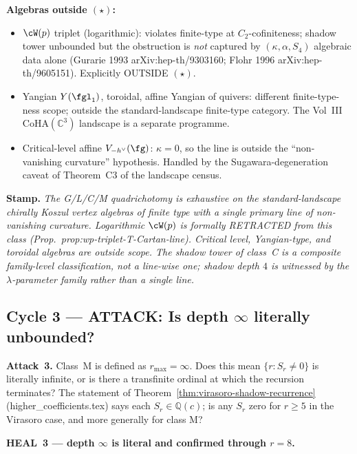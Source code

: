 \textbf{Algebras outside $(\star)$:}

\begin{itemize}
\item $\cW(p)$ triplet (logarithmic): violates finite-type at
  $C_2$-cofiniteness; shadow tower unbounded but the obstruction is
  \emph{not} captured by $(\kappa, \alpha, S_4)$ algebraic data alone
  (Gurarie 1993 arXiv:hep-th/9303160; Flohr 1996
  arXiv:hep-th/9605151). Explicitly OUTSIDE $(\star)$.
\item Yangian $Y(\fgl_1)$, toroidal, affine Yangian of quivers: different
  finite-type-ness scope; outside the standard-landscape finite-type
  category. The Vol~III CoHA$(\mathbb C^3)$ landscape is a separate
  programme.
\item Critical-level affine $V_{-h^\vee}(\fg)$: $\kappa = 0$, so the line
  is outside the ``non-vanishing curvature'' hypothesis. Handled by the
  Sugawara-degeneration caveat of Theorem~C3 of the landscape census.
\end{itemize}

\textbf{Stamp.} \emph{The G/L/C/M quadrichotomy is exhaustive on the
standard-landscape chirally Koszul vertex algebras of finite type with a
single primary line of non-vanishing curvature. Logarithmic $\cW(p)$ is
formally RETRACTED from this class (Prop.~prop:wp-triplet-T-Cartan-line).
Critical level, Yangian-type, and toroidal algebras are outside scope. The
shadow tower of class~C is a composite family-level classification, not a
line-wise one; shadow depth $4$ is witnessed by the $\lambda$-parameter
family rather than a single line.}

\subsection*{Cycle 3 --- ATTACK: Is depth $\infty$ literally unbounded?}

\textbf{Attack~3.} Class~M is defined as $r_{\max} = \infty$. Does this
mean $\{r : S_r \ne 0\}$ is literally infinite, or is there a transfinite
ordinal at which the recursion terminates? The statement of
Theorem~\ref{thm:virasoro-shadow-recurrence} (higher\_coefficients.tex)
says each $S_r \in \mathbb Q(c)$; is any $S_r$ zero for $r \ge 5$ in the
Virasoro case, and more generally for class M?

\textbf{HEAL~3 --- depth $\infty$ is literal and confirmed through $r = 8$.}

